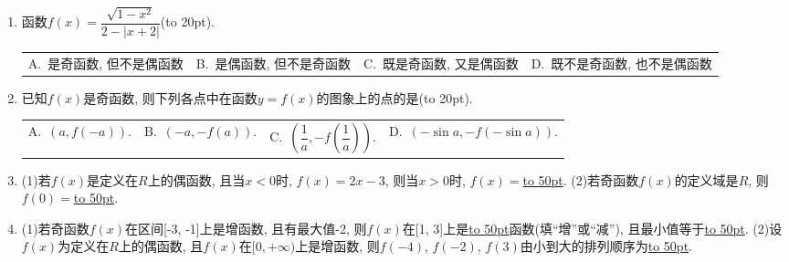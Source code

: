 \documentclass[10pt,a4paper]{article}
\newcommand{\blank}[1]{\underline{\hbox to #1pt{}}}
\newcommand{\bracket}[1]{(\hbox to #1pt{})}
\newcommand{\fourch}[4]{\par\begin{tabular}{p{.23\textwidth}p{.23\textwidth}p{.23\textwidth}p{.23\textwidth}}
A.~#1 &B.~#2& C.~#3& D.~#4
\end{tabular}}
\begin{document}
\begin{enumerate}[1.]
\fourch{$f(-1)<f(3).$}{$f(0)<f(6).$}{$f(3)>f(2).$}{$f(2)>f(0).$}
\item 函数$f(x)=\dfrac{\sqrt {1-x^2}}{2-|x+2|}$\bracket{20}.
\fourch{是奇函数, 但不是偶函数}{是偶函数, 但不是奇函数}{既是奇函数, 又是偶函数}{既不是奇函数, 也不是偶函数}
\item 已知$f(x)$是奇函数, 则下列各点中在函数$y=f(x)$的图象上的点的是\bracket{20}.
\fourch{$(a,f(-a)).$}{$(-a,-f(a)).$}{$(\dfrac 1a,-f(\dfrac 1a)).$}{$(-\sin a,-f(-\sin a)).$}
\item (1)若$f(x)$是定义在$R$上的偶函数, 且当$x<0$时, $f(x)=2x-3$, 则当$x>0$时, $f(x)=$\blank{50}.
(2)若奇函数$f(x)$的定义域是$R$, 则$f(0)=$\blank{50}.
\item (1)若奇函数$f(x)$在区间[-3, -1]上是增函数, 且有最大值-2, 则$f(x)$在[1, 3]上是\blank{50}函数(填``增''或``减''), 且最小值等于\blank{50}.
(2)设$f(x)$为定义在$R$上的偶函数, 且$f(x)$在$[ 0,+\infty)$上是增函数, 则$f(-4)$, $f(-2)$, $f(3)$由小到大的排列顺序为\blank{50}.


\end{enumerate}
\end{document}
